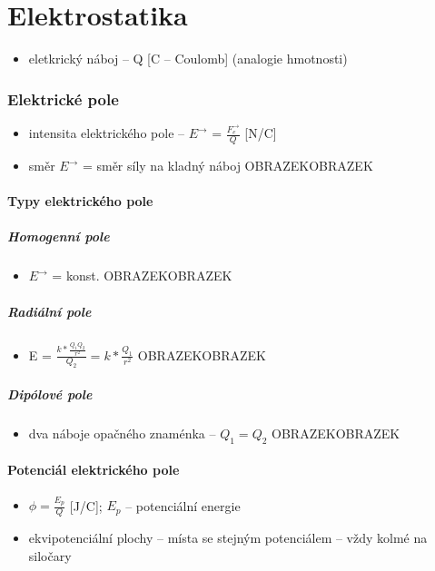 \documentclass{article}
\begin{document}
\part{Elektrostatika}
\begin{itemize}
  \item eletkrický náboj -- Q [C -- Coulomb] (analogie hmotnosti)
\end{itemize}
\section{Elektrické pole}
\begin{itemize}
  \item intensita elektrického pole -- $E^{\rightarrow}$ = $\frac{F_e^{\rightarrow}}{Q}$ [N/C]
  \item směr $E^{\rightarrow}$ = směr síly na kladný náboj OBRAZEKOBRAZEK
\end{itemize}
\subsection{Typy elektrického pole}
\subsubsection{Homogenní pole}
\begin{itemize}
  \item $E^{\rightarrow}$ = konst. OBRAZEKOBRAZEK
\end{itemize}
\subsubsection{Radiální pole}
\begin{itemize}
  \item E = $\frac{k*\frac{Q_1 Q_2}{r^2}}{Q_2} = k*\frac{Q_1}{r^2}$ OBRAZEKOBRAZEK
\end{itemize}
\subsubsection{Dipólové pole}
\begin{itemize}
  \item dva náboje opačného znaménka -- $Q_1 = Q_2$ OBRAZEKOBRAZEK
\end{itemize}
\subsection{Potenciál elektrického pole}
\begin{itemize}
  \item $\phi = \frac{E_p}{Q}$ [J/C]; $E_p$ -- potenciální energie
  \item ekvipotenciální plochy -- místa se stejným potenciálem -- vždy kolmé na siločary
\end{itemize}
\end{document}
